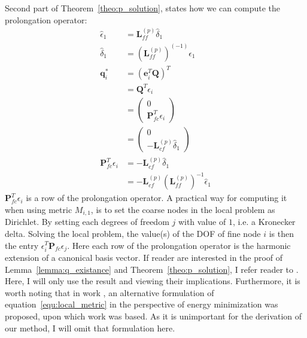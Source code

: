 Second part of Theorem~\ref{theo:p_solution}, states how we can compute the prolongation operator:
\begin{align*}
\hat{\epsilon}_1 &= \mathbf{L}^{(p)}_{ff}\hat{\delta}_1\\
\hat{\delta}_1 &= (\mathbf{L}^{(p)}_{ff})^{(-1)}\hat{\epsilon}_1\\
\mathbf{q}_i^* &= (\mathbf{e}^T_i\mathbf{Q})^T\\
&= \mathbf{Q}^T\epsilon_i \\
&= \left(\begin{array}{c} 0 \\ \mathbf{P}^T_{fc}\epsilon_i\end{array}\right) \\
&= \left(\begin{array}{c}0 \\ -\mathbf{L}^{(p)}_{cf}\hat{\delta}_1\end{array}\right) \\
\mathbf{P}^T_{fc}\epsilon_i &=  -\mathbf{L}^{(p)}_{cf}\hat{\delta}_1 \\
&= -\mathbf{L}^{(p)}_{cf}(\mathbf{L}^{(p)}_{ff})^{-1}\hat{\epsilon}_1
\end{align*}
$\mathbf{P}^T_{fc}\epsilon_i$ is a row of the prolongation operator. A practical way for computing it when using metric $M_{i,1}$, is to set the coarse nodes in the local problem as Dirichlet. By setting each degrees of freedom $j$ with value of $1$, i.e. a Kronecker delta. Solving the local problem, the value(s) of the DOF of fine node $i$ is then the entry $\epsilon^T_i\mathbf{P}_{fc}\epsilon_j$.
Here each row of the prolongation operator is the harmonic extension of a canonical basis vector.
If reader are interested in the proof of Lemma~\ref{lemma:q_existance} and Theorem~\ref{theo:p_solution}, I refer reader to \cite{brezina2001algebraic}. Here, I will only use the result and viewing their implications. Furthermore, it is worth noting that in work \cite{henson2001element}, an alternative formulation of equation~\ref{equ:local_metric} in the perspective of energy minimization was proposed, upon which work \cite{dohrmann2007interpolation} was based. As it is unimportant for the derivation of our method, I will omit that formulation here.